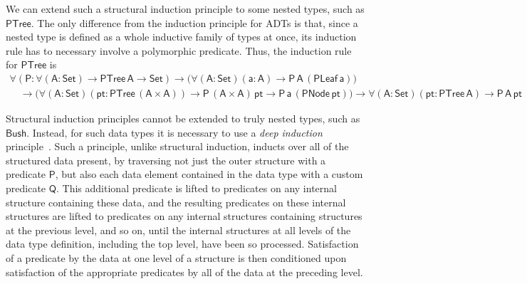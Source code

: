 \documentclass[9pt]{entcs} \usepackage{entcsmacro}
\begin{document}
We can extend such a structural induction principle to some nested types, such as $\mathsf{PTree}$.
The only difference from the induction principle for ADTs is that,
since a nested type is defined as a whole inductive family of types at once,
its induction rule has to necessary involve a polymorphic predicate.
Thus, the induction rule for $\mathsf{PTree}$ is
\[
\begin{array}{l}
\mathsf{\forall (P : \forall (A : Set) \to PTree\, A \to Set)
\to \big( \forall (A : Set) (a : A) \to P\,A\,(PLeaf\, a) \big)} \\
\quad\mathsf{\to \big( \forall (A : Set) (pt : PTree\,(A \times A)) \to P\,(A \times A)\,pt \to P\,a\,(PNode\,pt)\big)
\to \forall (A : Set) (pt : PTree\,A) \to P\,A\,pt }
\end{array}
\]

Structural induction principles cannot be extended to truly nested types, such as $\mathsf{Bush}$.
Instead, for such data types it is necessary to use a \emph{deep induction} principle~\cite{jp20}.
Such a principle, unlike structural induction, inducts over all of the structured data present,
by traversing not just the outer structure with a predicate $\mathsf{P}$,
but also each data element contained in the data type with a custom predicate $\mathsf{Q}$.
This additional predicate is lifted to predicates on any internal structure containing these data, and the resulting predicates on these internal structures are lifted to predicates on any internal structures containing structures at the previous level, and so on, until the internal structures at all levels of the data type definition, including the top level, have been so processed.
Satisfaction of a predicate by the data at one level of a structure is then conditioned upon satisfaction of the appropriate predicates by all of the data at the preceding level.
\end{document}
